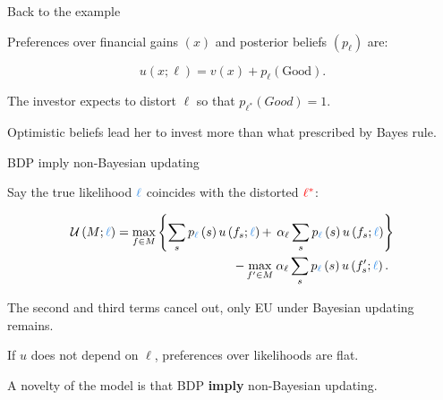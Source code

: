 \documentclass[usenames,dvipsnames,aspectratio=169,11pt]{beamer}
\begin{document}
\begin{frame}{Back to the example}
	\vfill

	Preferences over financial gains \( \left( x \right) \) and posterior beliefs \( \left( p_{\ell} \right) \) are:

	\vfill

	\[
		u \left( x; \ell \right) = v \left( x \right) + p_{\ell} \left( \text{Good} \right).
	\] \pause

	\vfill

	The investor expects to distort \( \ell \) so that \( p_{\ell^{*}} \left( Good \right) = 1 \).

	\vfill

	Optimistic beliefs lead her to invest more than what prescribed by Bayes rule.
\end{frame}

\begin{frame}{BDP imply non-Bayesian updating}

	Say the true likelihood \( \textcolor{RoyalBlue}{\ell} \) coincides with the distorted \( \textcolor{red}{\ell^{*}} \):

	\vfill

	\[
		\begin{aligned}
			\mathcal{U} \left(M ; \textcolor{RoyalBlue}{\ell} \right) = \max _{f \in M}\left\{\sum_{s} p_{\textcolor{RoyalBlue}{\ell}} \left( s \right) u \left( f_{s} ; \textcolor{RoyalBlue}{\ell} \right) + \right. & \left. \alpha_{\ell} \sum_{s} p_{\textcolor{RoyalBlue}{\ell}} \left( s \right) u \left( f_{s} ; \textcolor{RoyalBlue}{\ell} \right) \right\} \\
			-\max _{f^{\prime} \in M}                                                                                                                                                                                  & \: \alpha _{\ell} \sum_{s} p_{\textcolor{RoyalBlue}{\ell}} \left( s \right) u\left(f^{\prime}_{s} ; \textcolor{RoyalBlue}{\ell} \right) .
		\end{aligned}
	\]

	\vfill

	The second and third terms cancel out, only EU under Bayesian updating remains. \pause

	\vfill

	If \( u \) does not depend on \( \ell \), preferences over likelihoods are flat.

	\vfill
	A novelty of the model is that BDP \textbf{imply} non-Bayesian updating.

\end{frame}
\end{document}
